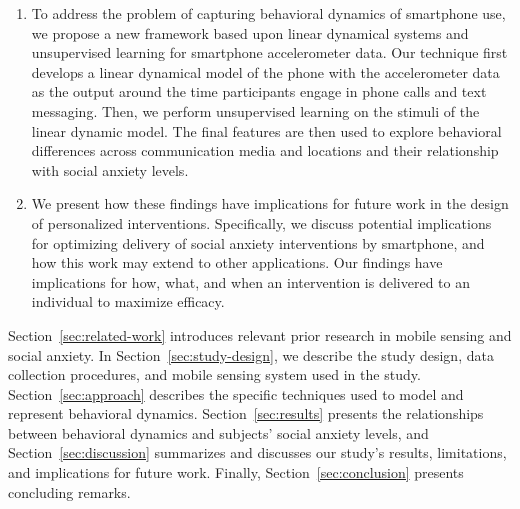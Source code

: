 \begin{enumerate}
\item To address the problem of capturing behavioral dynamics of smartphone use, we propose a new framework based upon linear dynamical systems and unsupervised learning for smartphone accelerometer data.  Our technique first develops a linear dynamical model of the phone with the accelerometer data as the output around the time participants engage in phone calls and text messaging. Then, we perform unsupervised learning on the stimuli of the linear dynamic model. The final features are then used to explore behavioral differences across communication media and locations and their relationship with social anxiety levels.


\item We present how these findings have implications for future work in the design of personalized interventions. Specifically, we discuss potential implications for optimizing delivery of social anxiety interventions by smartphone, and how this work may extend to other applications. Our findings have implications for how, what, and when an intervention is delivered to an individual to maximize efficacy.
\end{enumerate}

Section~\ref{sec:related-work} introduces relevant prior research in mobile sensing and social anxiety. In Section~\ref{sec:study-design}, we describe the study design, data collection procedures, and mobile sensing system used in the study. Section~\ref{sec:approach} describes the specific techniques used to model and represent behavioral dynamics.  Section~\ref{sec:results} presents the relationships between behavioral dynamics and subjects' social anxiety levels, and Section~\ref{sec:discussion} summarizes and discusses our study's results, limitations, and implications for future work.  Finally, Section~\ref{sec:conclusion} presents concluding remarks.

